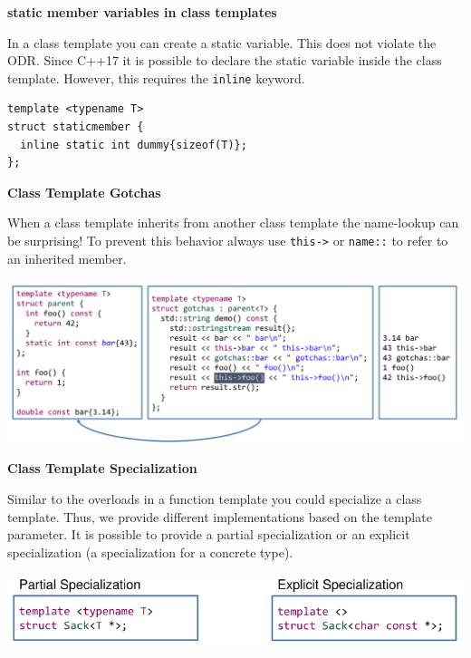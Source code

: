 \documentclass[11pt,twoside,landscape]{article}
\begin{document}
\begin{multicols}{3}
\textbf{static member variables in class templates}

In a class template you can create a static variable.
This does not violate the ODR.
Since C++17 it is possible to declare the static variable inside the class template.
However, this requires the \texttt{inline} keyword.


\lstset{language=c++,label= ,caption= ,captionpos=b,numbers=none}
\begin{lstlisting}
template <typename T>
struct staticmember {
  inline static int dummy{sizeof(T)};
};
\end{lstlisting}

\textbf{Class Template Gotchas}

When a class template inherits from another class template the name-lookup can be surprising!
To prevent this behavior always use \texttt{this->} or \texttt{name::} to refer to an inherited member.

{
\begin{center}
\includegraphics[width=.9\linewidth]{img/class_template_gotchas.png}
\end{center}
}

\textbf{Class Template Specialization}

Similar to the overloads in a function template you could specialize a class template.
Thus, we provide different implementations based on the template parameter.
It is possible to provide a partial specialization or an explicit specialization (a specialization for a concrete type).

{
\begin{center}
\includegraphics[width=.9\linewidth]{img/partial_explicit_specialization.png}
\end{center}
}


\end{multicols}
\end{document}
